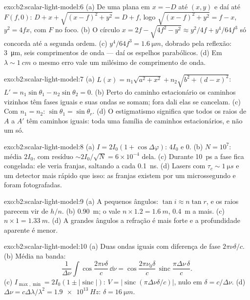 \begin{solution}{exo:b2:scalar-light-model:6}
(a) De uma  plana em $x = -D$ até $(x, y)$ e daí até $F(f, 0)$: $D + x
+ \sqrt{(x - f)^2 + y^2} = D + f$, logo $\sqrt{(x - f)^2 + y^2} = f - x$, $y^2 = 4fx$,
com $F$ no foco. (b) O círculo $x = 2f - \sqrt{4f^2 - y^2} \approx y^2/4f +
y^4/64f^3$ só concorda até a segunda ordem. (c) $y^4/64f^3 = \qty{1.6}{\micro m}$, dobrado
pela reflexão: \qty{3}{\micro m}, seis comprimentos de onda --- daí os
espelhos parabólicos. (d) Em $\lambda \sim \qty{1}{cm}$ o mesmo erro vale um milésimo de
comprimento de onda.
\end{solution}

\begin{solution}{exo:b2:scalar-light-model:7}
(a) $L(x) = n_1\sqrt{a^2 + x^2} + n_2\sqrt{b^2 + (d - x)^2}$: $L' = n_1\sin\theta_1 -
n_2\sin\theta_2 = 0$. (b) Perto do caminho estacionário os caminhos vizinhos têm
fases iguais e suas ondas se somam; fora dali elas se cancelam. (c) Com $n_1 = n_2$:
$\sin\theta_1 = \sin\theta_r$. (d) O estigmatismo significa que todos os raios de $A$ a $A'$ têm
caminhos iguais: toda uma família de caminhos estacionários, e não um só.
\end{solution}

\begin{solution}{exo:b2:scalar-light-model:8}
(a) $I = 2I_0(1 + \cos\Delta\varphi)$: $4I_0$ e $0$. (b) $N = 10^7$: média $2I_0$, com resíduo
$\sim 2I_0/\sqrt N = 6 \times 10^{-4}$ dela. (c) Durante \qty{10}{ps} a fase fica
congelada: ele veria franjas, saltando a cada \qty{0.1}{ns}. (d) Lasers com
$\tau_c \sim \qty{1}{\micro s}$ e um detector mais rápido que isso: as franjas existem
por um microssegundo e foram fotografadas.
\end{solution}

\begin{solution}{exo:b2:scalar-light-model:9}
(a) A pequenos ângulos: $\tan i \approx n\tan r$, e os raios parecem vir de $h/n$.
(b) \qty{0.90}{m}; o  vale $n \times 1.2 = \qty{1.6}{m}$, \qty{0.4}{m} a mais.
(c) $n \times 1 = \qty{1.33}{m}$. (d) A grandes ângulos a refração é mais forte
e a profundidade aparente é menor.
\end{solution}

\begin{solution}{exo:b2:scalar-light-model:10}
(a) Duas ondas iguais com diferença de fase $2\pi\nu\delta/c$. (b) Média
na banda:
\[
\frac1{\Delta\nu}\int\cos\frac{2\pi\nu\delta}c\,\dd\nu = \cos\frac{2\pi\nu_0\delta}c\,\operatorname{sinc}\frac{\pi\Delta\nu\,\delta}c .
\]
(c)
$I_{\max, \min} = 2I_0(1 \pm |\operatorname{sinc}|)$: $V = |\operatorname{sinc}(\pi\Delta\nu\delta/c)|$,
nulo em $\delta = c/\Delta\nu$. (d) $\Delta\nu = c\Delta\lambda/\lambda^2 = \qty{1.9e13}{Hz}$: $\delta =
\qty{16}{\micro m}$.
\end{solution}

